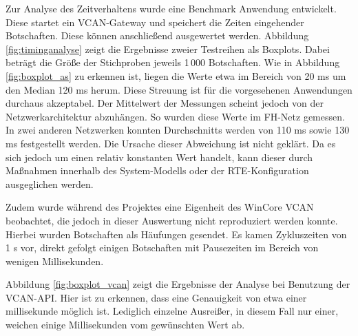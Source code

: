 \documentclass[
  a4paper,					    %
  twoside,
  DIV=calc,     				%
  bibliography=totoc,
  cleardoublepage=empty,
  ngerman,     					%
  final       					%
]{scrbook}
\begin{document}
Zur Analyse des Zeitverhaltens wurde eine Benchmark Anwendung entwickelt. Diese startet ein VCAN-Gateway und speichert die Zeiten eingehender Botschaften. Diese können anschließend ausgewertet werden. Abbildung \ref{fig:timinganalyse} zeigt die Ergebnisse zweier Testreihen als Boxplots. Dabei beträgt die Größe der Stichproben jeweils 1\,000 Botschaften. Wie in Abbildung \ref{fig:boxplot_as} zu erkennen ist, liegen die Werte etwa im Bereich von 20 ms um den Median 120 ms herum. Diese Streuung ist für die vorgesehenen Anwendungen durchaus akzeptabel. Der Mittelwert der Messungen scheint jedoch von der Netzwerkarchitektur abzuhängen. So wurden diese Werte im FH-Netz gemessen. In zwei anderen Netzwerken konnten Durchschnitts werden von 110 ms sowie 130 ms festgestellt werden. Die Ursache dieser Abweichung ist nicht geklärt. Da es sich jedoch um einen relativ konstanten Wert handelt, kann dieser durch Maßnahmen innerhalb des System-Modells oder der RTE-Konfiguration ausgeglichen werden.

Zudem wurde während des Projektes eine Eigenheit des WinCore VCAN beobachtet, die jedoch in dieser Auswertung nicht reproduziert werden konnte. Hierbei wurden Botschaften als Häufungen gesendet. Es kamen Zykluszeiten von 1 s vor, direkt gefolgt einigen Botschaften mit Pausezeiten im Bereich von wenigen Millisekunden.

Abbildung \ref{fig:boxplot_vcan} zeigt die Ergebnisse der Analyse bei Benutzung der VCAN-API. Hier ist zu erkennen, dass eine Genauigkeit von etwa einer millisekunde möglich ist. Lediglich einzelne Ausreißer, in diesem Fall nur einer, weichen einige Millisekunden vom gewünschten Wert ab.
\end{document}
